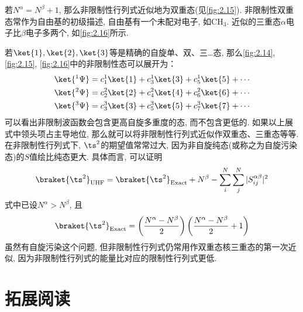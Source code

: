 若$N^\alpha=N^\beta+1$, 
那么非限制性行列式近似地为双重态(见\autoref{fig:2.15}). 
非限制性双重态常作为自由基的初级描述, 
自由基有一个未配对电子, 
如$\mathrm{CH}_3$. 
近似的三重态$\alpha$电子比$\beta$电子多两个, 
如\autoref{fig:2.16}所示.


若$\ket{1},\ket{2},\ket{3}$等是精确的自旋单、双、三…态, 
那么\autoref{fig:2.14},
\autoref{fig:2.15}, 
\autoref{fig:2.16}中的非限制性态可以展开为：
\begin{subequations}
	\begin{align}
	\ket{^1\Psi} = c_1^1\ket{1} + c_3^1\ket{3} + c_5^1\ket{5} + \cdots\\
	\ket{^2\Psi} = c_2^2\ket{2} + c_4^2\ket{4} + c_6^2\ket{6} + \cdots\\
	\ket{^3\Psi} = c_3^3\ket{3} + c_5^3\ket{5} + c_7^3\ket{7} + \cdots  
	\end{align}
\end{subequations}
可以看出非限制波函数会包含更高自旋多重度的态, 
而不包含更低的. 
如果以上展式中领头项占主导地位,
那么就可以将非限制性行列式近似作双重态、三重态等等. 
在非限制性行列式下, 
$\ts^2$的期望值常常过大, 
因为非自旋纯态(或称之为自旋污染态)的$S$值绘比纯态更大. 
具体而言, 
可以证明
\begin{align}\label{eq:2.271}
\braket{\ts^2}_\mathrm{UHF} = \braket{\ts^2}_\mathrm{Exact} + N^\beta - \sum_i^N\sum_j^N|S_{ij}^{\alpha\beta}|^2
\end{align}
式中已设$N^\alpha > N^\beta$, 
且
\begin{align}
	\braket{\ts^2}_\mathrm{Exact} = \left( \frac{N^\alpha - N^\beta}{2} \right) \left( \frac{N^\alpha - N^\beta}{2} + 1\right)
\end{align}
虽然有自旋污染这个问题, 
但非限制性行列式仍常用作双重态核三重态的第一次近似, 
因为非限制性行列式的能量比对应的限制性行列式更低.


\theendnotes
{}
\section*{拓展阅读}

